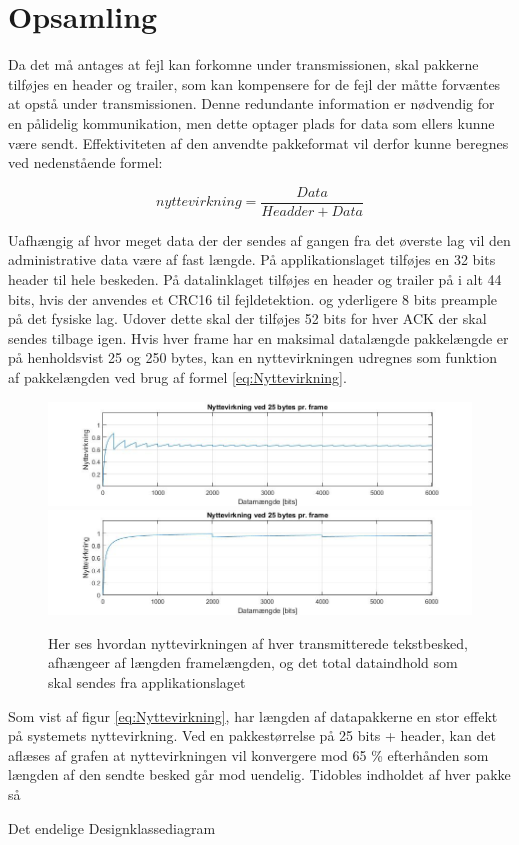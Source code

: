 \section{Opsamling}
Da det må antages at fejl kan forkomne under transmissionen, skal pakkerne tilføjes en header og trailer, som kan kompensere for de fejl der måtte forvæntes at opstå under transmissionen. Denne redundante information er nødvendig for en pålidelig kommunikation, men dette optager plads for data som ellers kunne være sendt. Effektiviteten af den anvendte pakkeformat vil derfor kunne beregnes ved nedenstående formel: 

\begin{equation}
nyttevirkning = \frac{Data}{Headder + Data}
\label{eq:Nyttevirkning}
\end{equation}

Uafhængig af hvor meget data der der sendes af gangen fra det øverste lag vil den administrative data være af fast længde. På applikationslaget tilføjes en 32 bits header til hele beskeden. På datalinklaget tilføjes en header og trailer på i alt 44 bits, hvis der anvendes et CRC16 til fejldetektion. og yderligere 8 bits preample på det fysiske lag. Udover dette skal der tilføjes 52 bits for hver ACK der skal sendes tilbage igen. Hvis hver frame har en maksimal datalængde pakkelængde er på henholdsvist 25 og 250 bytes, kan en nyttevirkningen udregnes som funktion af pakkelængden ved brug af formel \eqref{eq:Nyttevirkning}.  

\begin{figure}[h]
\centering
\includegraphics[scale=0.5]{Billeder/Nyttevirkning_25.jpg} 
\includegraphics[scale=0.5]{Billeder/Nyttevirkning_250.jpg}
\caption{ Her ses hvordan nyttevirkningen af hver transmitterede tekstbesked, afhængeer af længden framelængden, og det total dataindhold som skal sendes fra applikationslaget}
\label{fig:Nyttevirkning_ved_25}
\end{figure}

Som vist af figur \ref{eq:Nyttevirkning}, har længden af datapakkerne en stor effekt på systemets nyttevirkning. Ved en pakkestørrelse på 25 bits + header, kan det aflæses af grafen at nyttevirkningen vil konvergere mod 65 \% efterhånden som længden af den sendte besked går mod uendelig. Tidobles indholdet af hver pakke så 

Det endelige Designklassediagram
